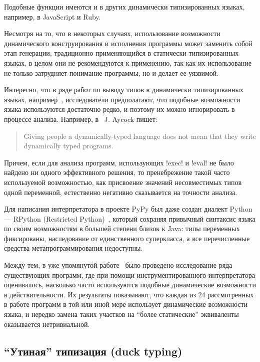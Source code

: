 \begin{itemize}
{      Подобные функции имеются и в других динамически типизированных языках,
      например, в JavaScript и Ruby.

      Несмотря на то, что в некоторых случаях, использование возможности
      динамического конструирования и исполнения программы может заменить собой
      этап генерации, традиционно применяющийся в статически типизированных
      языках, в целом они не рекомендуются к применению, так как их
      использование не только затрудняет понимание программы, но и делает ее
      уязвимой.

    }
\end{itemize}

Интересно, что в ряде работ по выводу типов в динамически типизированных языках,
например~\cite{Salib2004,Aycock2000}, исследователи предполагают, что подобные
возможности языка используются достаточно редко, и поэтому их можно игнорировать
в процессе анализа.  Например, в~\cite{Aycock2000} J. Aycock пишет:

\begin{quote} Giving people a dynamically-typed language does not mean that they
  write dynamically typed programs. 
\end{quote}

Причем, если для анализа программ, использующих !exec! и !eval! не было найдено
ни одного эффективного решения, то пренебрежение такой часто используемой
возможностью, как присвоение значений несовместимых типов одной переменной,
естественно негативно сказывается на точности анализа. 

Для написания интерпретатора в проекте PyPy был даже создан диалект Python ---
RPython (Restricted Python)~\cite{Ancona2007}, который сохраняя привычный
синтаксис языка по своим возможностям в большей степени близок к Java: типы
переменных фиксированы, наследование от единственного суперкласса, а все
перечисленные средства метапрограммирования недоступны. 

Между тем, в уже упомянутой работе~\cite{Holkner2009} было проведено
исследование ряда существующих программ, где при помощи инструментированного
интерпретатора оценивалось, насколько часто используются подобные динамические
возможности в действительности. Их результаты показывают, что каждая из 24
рассмотренных в работе программ в той или иной мере использует динамические
возможности языка, и нередко замена таких участков на ``более статические''
эквиваленты оказывается нетривиальной. 


\subsection{``Утиная'' типизация (duck typing)}

